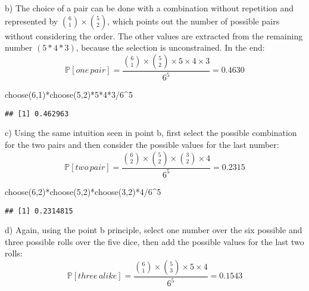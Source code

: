 \documentclass[
]{article}
\newenvironment{Shaded}{\begin{snugshade}}{\end{snugshade}}
\newcommand{\DecValTok}[1]{\textcolor[rgb]{0.00,0.00,0.81}{#1}}
\newcommand{\FunctionTok}[1]{\textcolor[rgb]{0.00,0.00,0.00}{#1}}
\newcommand{\NormalTok}[1]{#1}
\newcommand{\SpecialCharTok}[1]{\textcolor[rgb]{0.00,0.00,0.00}{#1}}
\begin{document}
b) The choice of a pair can be done with a combination without
repetition and represented by \({6 \choose 1} \times {5 \choose 2}\),
which points out the number of possible pairs without considering the
order. The other values are extracted from the remaining number
\((5*4*3)\), because the selection is unconstrained. In the end:
\[\mathbb P[one\, pair]=\frac{{6 \choose 1} \times {5 \choose 2} \times 5 \times 4 \times 3}{6^5}=0.4630\]

\begin{Shaded}
\begin{Highlighting}[]
\FunctionTok{choose}\NormalTok{(}\DecValTok{6}\NormalTok{,}\DecValTok{1}\NormalTok{)}\SpecialCharTok{*}\FunctionTok{choose}\NormalTok{(}\DecValTok{5}\NormalTok{,}\DecValTok{2}\NormalTok{)}\SpecialCharTok{*}\DecValTok{5}\SpecialCharTok{*}\DecValTok{4}\SpecialCharTok{*}\DecValTok{3}\SpecialCharTok{/}\DecValTok{6}\SpecialCharTok{\^{}}\DecValTok{5}
\end{Highlighting}
\end{Shaded}

\begin{verbatim}
## [1] 0.462963
\end{verbatim}

c) Using the same intuition seen in point b, first select the possible
combination for the two pairs and then consider the possible values for
the last number:
\[\mathbb P[two\, pair]=\frac{{6 \choose 2} \times {5 \choose 2} \times {3 \choose 2} \times 4}{6^5}=0.2315\]

\begin{Shaded}
\begin{Highlighting}[]
\FunctionTok{choose}\NormalTok{(}\DecValTok{6}\NormalTok{,}\DecValTok{2}\NormalTok{)}\SpecialCharTok{*}\FunctionTok{choose}\NormalTok{(}\DecValTok{5}\NormalTok{,}\DecValTok{2}\NormalTok{)}\SpecialCharTok{*}\FunctionTok{choose}\NormalTok{(}\DecValTok{3}\NormalTok{,}\DecValTok{2}\NormalTok{)}\SpecialCharTok{*}\DecValTok{4}\SpecialCharTok{/}\DecValTok{6}\SpecialCharTok{\^{}}\DecValTok{5}
\end{Highlighting}
\end{Shaded}

\begin{verbatim}
## [1] 0.2314815
\end{verbatim}

d) Again, using the point b principle, select one number over the six
possible and three possible rolls over the five dice, then add the
possible values for the last two rolls:
\[\mathbb P[three\, alike]=\frac{{6 \choose 1} \times {5 \choose 3} \times 5 \times 4}{6^5}=0.1543\]
\end{document}
